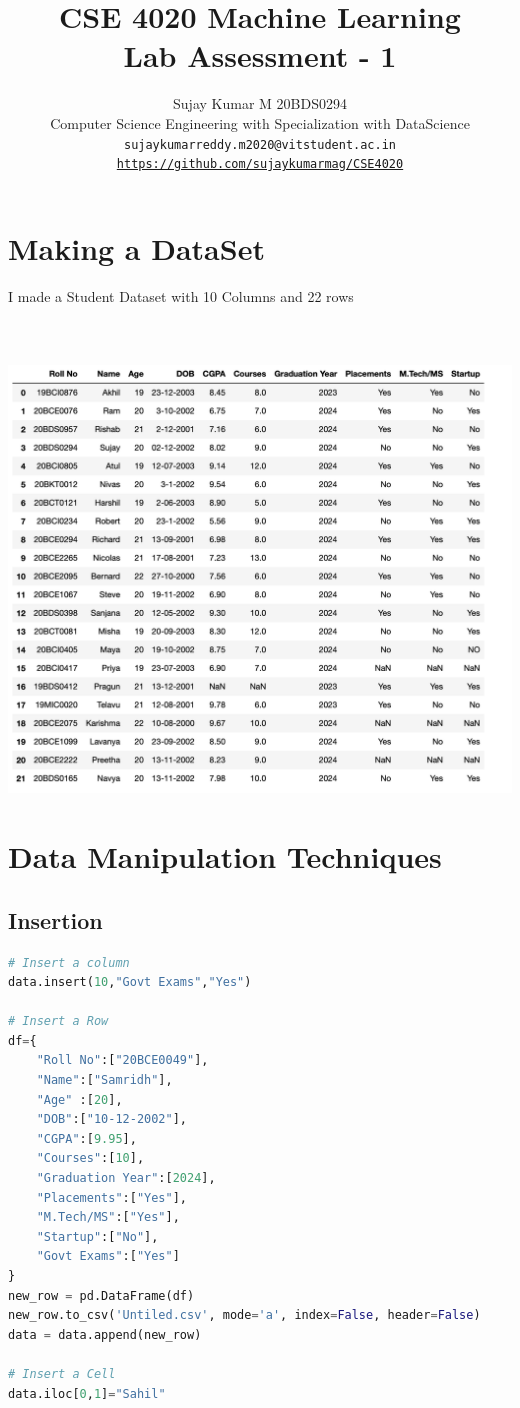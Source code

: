 \documentclass{article}
\title{CSE 4020 Machine Learning \\ Lab Assessment - 1  }
\author{Sujay Kumar M 20BDS0294\\ \small Computer Science Engineering with Specialization with DataScience\\ \tt sujaykumarreddy.m2020@vitstudent.ac.in
\\ \url{https://github.com/sujaykumarmag/CSE4020}}
\begin{document}
\maketitle
\section{Making a DataSet}
I made a Student Dataset with 10 Columns and 22 rows \\\\\\\
\includegraphics[scale=0.63]{images/one.png}

\section{Data Manipulation Techniques}
\subsection{Insertion}
\begin{lstlisting}[language=Python]
# Insert a column
data.insert(10,"Govt Exams","Yes")

# Insert a Row
df={
    "Roll No":["20BCE0049"],
    "Name":["Samridh"],
    "Age" :[20],
    "DOB":["10-12-2002"],
    "CGPA":[9.95],
    "Courses":[10],
    "Graduation Year":[2024],
    "Placements":["Yes"],
    "M.Tech/MS":["Yes"],
    "Startup":["No"],
    "Govt Exams":["Yes"]
}
new_row = pd.DataFrame(df)
new_row.to_csv('Untiled.csv', mode='a', index=False, header=False)
data = data.append(new_row)

# Insert a Cell
data.iloc[0,1]="Sahil"

\end{lstlisting}\\\\\\
\end{document}

